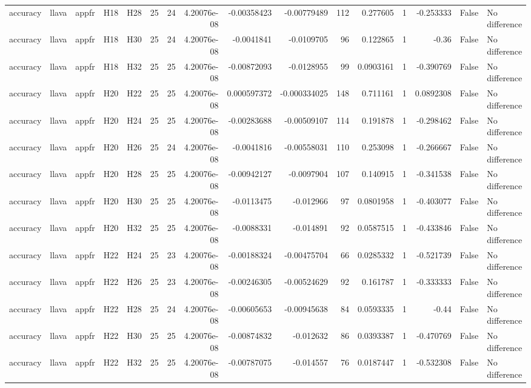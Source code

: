 \begin{longtable}{lllllrrrrrrrrrrl}
accuracy & llava & appfr & H18 & H28 & 25 & 24 & 4.20076e-08 & -0.00358423 & -0.00779489 & 112 & 0.277605 & 1 & -0.253333 & False & No difference \\
accuracy & llava & appfr & H18 & H30 & 25 & 24 & 4.20076e-08 & -0.0041841 & -0.0109705 & 96 & 0.122865 & 1 & -0.36 & False & No difference \\
accuracy & llava & appfr & H18 & H32 & 25 & 25 & 4.20076e-08 & -0.00872093 & -0.0128955 & 99 & 0.0903161 & 1 & -0.390769 & False & No difference \\
accuracy & llava & appfr & H20 & H22 & 25 & 25 & 4.20076e-08 & 0.000597372 & -0.000334025 & 148 & 0.711161 & 1 & 0.0892308 & False & No difference \\
accuracy & llava & appfr & H20 & H24 & 25 & 25 & 4.20076e-08 & -0.00283688 & -0.00509107 & 114 & 0.191878 & 1 & -0.298462 & False & No difference \\
accuracy & llava & appfr & H20 & H26 & 25 & 24 & 4.20076e-08 & -0.0041816 & -0.00558031 & 110 & 0.253098 & 1 & -0.266667 & False & No difference \\
accuracy & llava & appfr & H20 & H28 & 25 & 25 & 4.20076e-08 & -0.00942127 & -0.0097904 & 107 & 0.140915 & 1 & -0.341538 & False & No difference \\
accuracy & llava & appfr & H20 & H30 & 25 & 25 & 4.20076e-08 & -0.0113475 & -0.012966 & 97 & 0.0801958 & 1 & -0.403077 & False & No difference \\
accuracy & llava & appfr & H20 & H32 & 25 & 25 & 4.20076e-08 & -0.0088331 & -0.014891 & 92 & 0.0587515 & 1 & -0.433846 & False & No difference \\
accuracy & llava & appfr & H22 & H24 & 25 & 23 & 4.20076e-08 & -0.00188324 & -0.00475704 & 66 & 0.0285332 & 1 & -0.521739 & False & No difference \\
accuracy & llava & appfr & H22 & H26 & 25 & 23 & 4.20076e-08 & -0.00246305 & -0.00524629 & 92 & 0.161787 & 1 & -0.333333 & False & No difference \\
accuracy & llava & appfr & H22 & H28 & 25 & 24 & 4.20076e-08 & -0.00605653 & -0.00945638 & 84 & 0.0593335 & 1 & -0.44 & False & No difference \\
accuracy & llava & appfr & H22 & H30 & 25 & 25 & 4.20076e-08 & -0.00874832 & -0.012632 & 86 & 0.0393387 & 1 & -0.470769 & False & No difference \\
accuracy & llava & appfr & H22 & H32 & 25 & 25 & 4.20076e-08 & -0.00787075 & -0.014557 & 76 & 0.0187447 & 1 & -0.532308 & False & No difference \\

\end{longtable}
